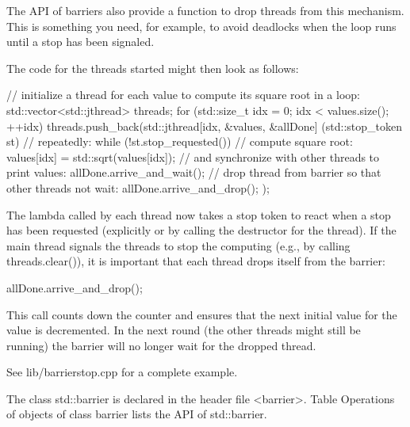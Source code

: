 The API of barriers also provide a function to drop threads from this mechanism. This is something you need, for example, to avoid deadlocks when the loop runs until a stop has been signaled.

The code for the threads started might then look as follows:

\begin{cpp}
// initialize a thread for each value to compute its square root in a loop:
std::vector<std::jthread> threads;
for (std::size_t idx = 0; idx < values.size(); ++idx) {
	threads.push_back(std::jthread{[idx, &values, &allDone] (std::stop_token st) {
									// repeatedly:
									while (!st.stop_requested()) {
										// compute square root:
										values[idx] = std::sqrt(values[idx]);
										// and synchronize with other threads to print values:
										allDone.arrive_and_wait();
									}
									// drop thread from barrier so that other threads not wait:
									allDone.arrive_and_drop();
							}});
}
\end{cpp}

The lambda called by each thread now takes a stop token to react when a stop has been requested (explicitly or by calling the destructor for the thread). If the main thread signals the threads to stop the computing (e.g., by calling threads.clear()), it is important that each thread drops itself from the barrier:

\begin{cpp}
allDone.arrive_and_drop();
\end{cpp}

This call counts down the counter and ensures that the next initial value for the value is decremented. In the next round (the other threads might still be running) the barrier will no longer wait for the dropped thread.

See lib/barrierstop.cpp for a complete example.


The class std::barrier is declared in the header file <barrier>. Table Operations of objects of class barrier lists the API of std::barrier.

